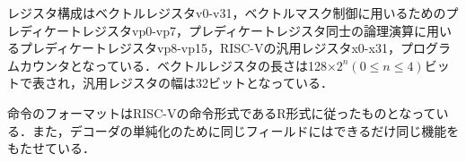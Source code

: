 レジスタ構成はベクトルレジスタv0-v31，ベクトルマスク制御に用いるためのプレディケートレジスタvp0-vp7，プレディケートレジスタ同士の論理演算に用いるプレディケートレジスタvp8-vp15，RISC-Vの汎用レジスタx0-x31，プログラムカウンタとなっている．ベクトルレジスタの長さは128$\times 2^n(0\leq n\leq 4)$ビットで表され，汎用レジスタの幅は32ビットとなっている．

命令のフォーマットはRISC-Vの命令形式であるR形式に従ったものとなっている．また，デコーダの単純化のために同じフィールドにはできるだけ同じ機能をもたせている．

